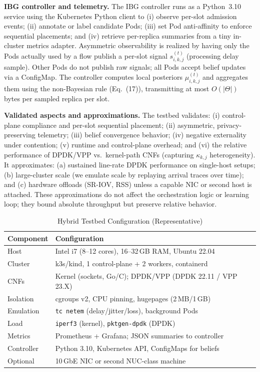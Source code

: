 \documentclass[journal]{IEEEtran}
\theoremstyle{plain}
\theoremstyle{definition}
\theoremstyle{remark}
\begin{document}
\textbf{IBG controller and telemetry.} The IBG controller runs as a Python~3.10 service using the Kubernetes Python client to (i) observe per-slot admission events; (ii) annotate or label candidate Pods; (iii) set Pod anti-affinity to enforce sequential placements; and (iv) retrieve per-replica summaries from a tiny in-cluster metrics adapter. Asymmetric observability is realized by having only the Pods actually used by a flow publish a per-slot signal $s_{i,k,j}^{(t)}$ (processing delay sample). Other Pods do not publish raw signals; all Pods accept belief updates via a ConfigMap. The controller computes local posteriors $\mu_{i,k,j}^{(t)}$ and aggregates them using the non-Bayesian rule (Eq.~(17)), transmitting at most $O(|\Theta|)$ bytes per sampled replica per slot.

\textbf{Validated aspects and approximations.} The testbed validates: (i) control-plane compliance and per-slot sequential placement; (ii) asymmetric, privacy-preserving telemetry; (iii) belief convergence behavior; (iv) negative externality under contention; (v) runtime and control-plane overhead; and (vi) the relative performance of DPDK/VPP vs.\ kernel-path CNFs (capturing $\kappa_{k,j}$ heterogeneity). It approximates: (a) sustained line-rate DPDK performance on single-host setups; (b) large-cluster scale (we emulate scale by replaying arrival traces over time); and (c) hardware offloads (SR-IOV, RSS) unless a capable NIC or second host is attached. These approximations do not affect the orchestration logic or learning loop; they bound absolute throughput but preserve relative behavior.

\begin{table}[!t]
\centering
\caption{Hybrid Testbed Configuration (Representative)}
\label{tab:testbed_cfg}
\begin{tabular}{ll}
\toprule
Component & Configuration \\
\midrule
Host & Intel i7 (8–12 cores), 16–32\,GB RAM, Ubuntu 22.04 \\
Cluster & k3s/kind, 1 control-plane + 2 workers, containerd \\
CNFs & Kernel (sockets, Go/C); DPDK/VPP (DPDK 22.11 / VPP 23.X) \\
Isolation & cgroups v2, CPU pinning, hugepages (2\,MB/1\,GB) \\
Emulation & \texttt{tc netem} (delay/jitter/loss), background Pods \\
Load & \texttt{iperf3} (kernel), \texttt{pktgen-dpdk} (DPDK) \\
Metrics & Prometheus + Grafana; JSON summaries to controller \\
Controller & Python 3.10, Kubernetes API, ConfigMaps for beliefs \\
Optional & 10\,GbE NIC or second NUC-class machine \\
\bottomrule
\end{tabular}
\end{table}
\end{document}
